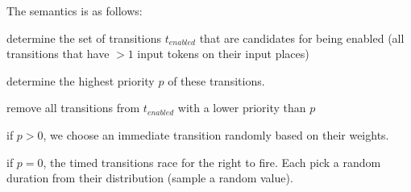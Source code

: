 The semantics is as follows:
\begin{compactitem}
  \item determine the set of transitions $t_{enabled}$ that are candidates for being enabled (all transitions that have $> 1$ input tokens on their input places)
  \item determine the highest priority $p$ of these transitions.
  \item remove all transitions from $t_{enabled}$ with a lower priority than $p$
  \begin{compactitem}
    \item if $p > 0$, we choose an immediate transition randomly based on their weights.
    \item if $p = 0$,  the timed transitions race for the right to fire. Each pick a random duration from their distribution (sample a random value).
  \end{compactitem}
\end{compactitem}




 